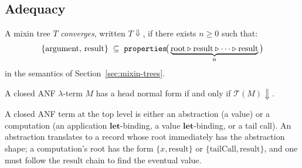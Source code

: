 \subsection{Adequacy}

\begin{definition}\label{def:convergence}
  A mixin tree $T$ \emph{converges}, written $T{\Downarrow}$,
  if there exists $n \ge 0$ such that:
  \[
    \{\mathrm{argument},\, \mathrm{result}\}
    \;\subseteq\;
    \mathtt{properties}\!\bigl(\,
      \underbrace{\text{root} \mathbin{\triangleright} \mathrm{result}
      \mathbin{\triangleright} \cdots \mathbin{\triangleright} \mathrm{result}}_{n}
    \,\bigr)
  \]
  in the semantics of
  Section~\ref{sec:mixin-trees}.
\end{definition}

\begin{theorem}[Adequacy]\label{thm:adequacy}
  A closed ANF $\lambda$-term $M$ has a head normal form if and
  only if $\mathcal{T}(M){\Downarrow}$.
\end{theorem}

A closed ANF term at the top level is either an abstraction
(a value) or a computation (an application
  $\mathbf{let}$-binding, a value $\mathbf{let}$-binding,
or a tail call).
An abstraction translates to a record whose root immediately
has the abstraction shape; a computation's root has the form
$\{x, \mathrm{result}\}$ or
$\{\mathrm{tailCall}, \mathrm{result}\}$, and one must follow
the $\mathrm{result}$ chain to find the eventual value.

